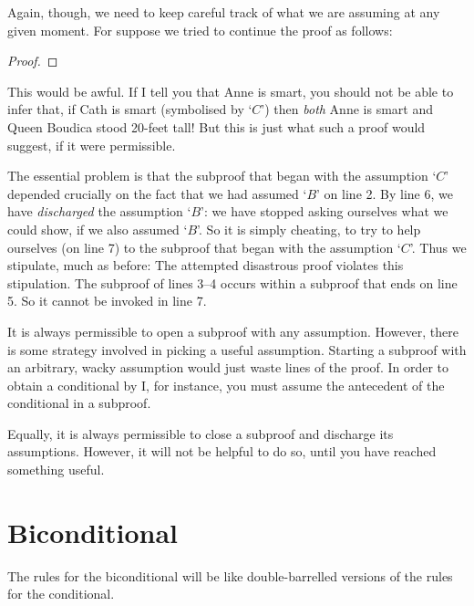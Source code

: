 Again, though, we need to keep careful track of what we are assuming at any given moment. For suppose we tried to continue the proof as follows:
\begin{proof}
\open
	\open
	\close
\close
{}
\end{proof}
This would be awful. If I tell you that Anne is smart, you should not be able to infer that, if Cath is smart (symbolised by `$C$') then \emph{both} Anne is smart and Queen Boudica stood 20-feet tall! But this is just what such a proof would suggest, if it were permissible.

The essential problem is that the subproof that began with the assumption `$C$' depended crucially on the fact that we had assumed `$B$' on line 2. By line 6, we have \emph{discharged} the assumption `$B$': we have stopped asking ourselves what we could show, if we also assumed `$B$'. So it is simply cheating, to try to help ourselves (on line 7) to the subproof that began with the assumption `$C$'. Thus we stipulate, much as before:
The attempted disastrous proof violates this stipulation. The subproof of lines 3--4 occurs within a subproof that ends on line 5. So it cannot be invoked in line 7.

It is always permissible to open a subproof with any assumption. However, there is some strategy involved in picking a useful assumption. Starting a subproof with an arbitrary, wacky assumption would just waste lines of the proof. In order to obtain a conditional by {\eif}I, for instance, you must assume the antecedent of the conditional in a subproof. 

Equally, it is always permissible to close a subproof and discharge its assumptions. However, it will not be helpful to do so, until you have reached something useful.


\section{Biconditional}
The rules for the biconditional will be like double-barrelled versions of the rules for the conditional.

